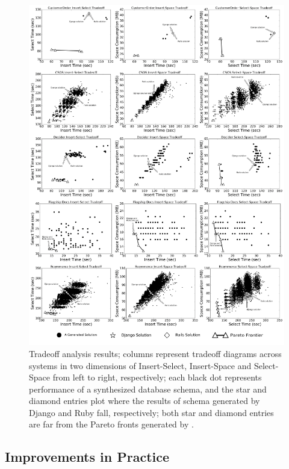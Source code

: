 \documentclass[10pt,conference]{IEEEtran}
\begin{document}
\begin{figure}[hbtp]
\centering
\includegraphics[width=\textwidth]{img/result_figure.pdf}
\vspace{-1cm}
\caption{Tradeoff analysis results; columns represent tradeoff diagrams across systems in two dimensions of Insert-Select, Insert-Space and Select-Space from left to right, respectively; each black dot represents performance of a synthesized database schema, and the star and diamond entries plot where the results of schema generated by Django and Ruby fall, respectively; both star and diamond entries are far from the Pareto fronts generated by \@approach.
}
\label{fig:analysis_result}
\end{figure}


\subsection{Improvements in Practice} %
\end{document}
